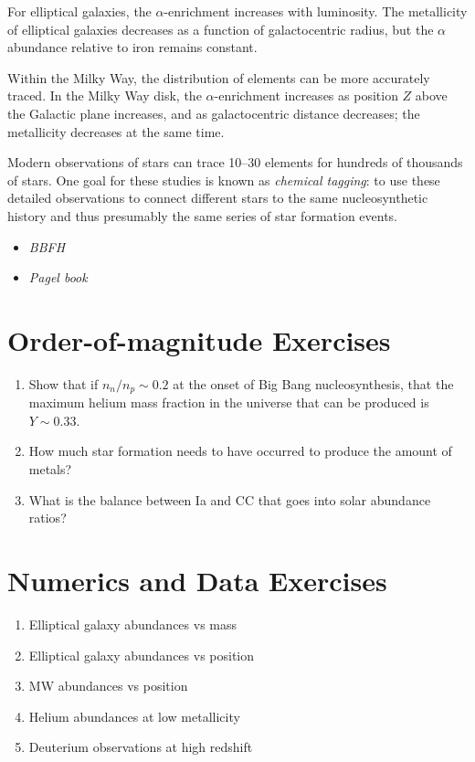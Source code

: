 For elliptical galaxies, the $\alpha$-enrichment increases with
luminosity. The metallicity of elliptical galaxies decreases as a
function of galactocentric radius, but the $\alpha$ abundance relative
to iron remains constant. 

Within the Milky Way, the distribution of elements can be more
accurately traced. In the Milky Way disk, the $\alpha$-enrichment
increases as position $Z$ above the Galactic plane increases, and as
galactocentric distance decreases; the metallicity decreases at the
same time.

Modern observations of stars can trace 10--30 elements for hundreds of
thousands of stars. One goal for these studies is known as {\it
  chemical tagging}: to use these detailed observations to connect
different stars to the same nucleosynthetic history and thus
presumably the same series of star formation events.

\begin{itemize}
  \item {\it BBFH}
  \item {\it Pagel book}
\end{itemize}

\section{Order-of-magnitude Exercises}

\begin{enumerate} 
\item Show that if $n_n/n_p \sim 0.2$ at the onset of Big Bang
  nucleosynthesis, that the maximum helium mass fraction in the
  universe that can be produced is $Y\sim 0.33$.
\item How much star formation needs to have occurred to produce the
  amount of metals?
\item What is the balance between Ia and CC that goes into solar
  abundance ratios?
\end{enumerate} 

\section{Numerics and Data Exercises}

\begin{enumerate}
\item Elliptical galaxy abundances vs mass
\item Elliptical galaxy abundances vs position
\item MW abundances vs position
\item Helium abundances at low metallicity
\item Deuterium observations at high redshift
\end{enumerate}


